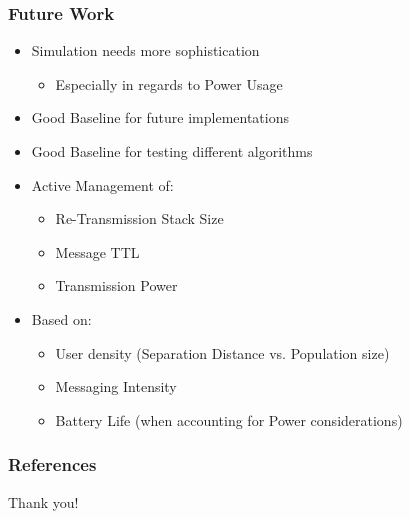 \begin{frame}
    \frametitle{Future Work}
    \begin{itemize}
        \item Simulation needs more sophistication
        \begin{itemize}
            \item Especially in regards to Power Usage
        \end{itemize}
        \item Good Baseline for future implementations
        \item Good Baseline for testing different algorithms\\[0.5cm]
    \end{itemize}

    \begin{itemize}
        \item Active Management of:
        \begin{itemize}
            \item Re-Transmission Stack Size
            \item Message TTL
            \item Transmission Power
        \end{itemize}
        \item Based on:
        \begin{itemize}
            \item User density (Separation Distance vs. Population size)
            \item Messaging Intensity
            \item Battery Life (when accounting for Power considerations)
        \end{itemize}
    \end{itemize}

\end{frame}

\begin{frame}[allowframebreaks]
    \frametitle{References}
\end{frame}

\begin{frame}
    \centering
    {\LARGE Thank you!}
\end{frame}


